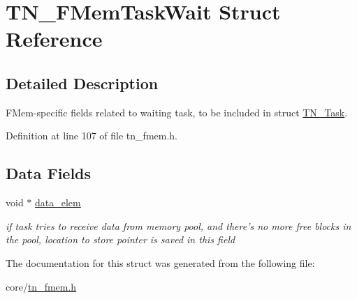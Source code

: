 \hypertarget{structTN__FMemTaskWait}{\section{T\+N\+\_\+\+F\+Mem\+Task\+Wait Struct Reference}
\label{structTN__FMemTaskWait}
}


\subsection{Detailed Description}
F\+Mem-\/specific fields related to waiting task, to be included in struct \hyperlink{structTN__Task}{T\+N\+\_\+\+Task}. 

Definition at line 107 of file tn\+\_\+fmem.\+h.

\subsection*{Data Fields}
\begin{DoxyCompactItemize}
\item 
\hypertarget{structTN__FMemTaskWait_a68632560b260859d863fbd3fc24b0506}{void $\ast$ \hyperlink{structTN__FMemTaskWait_a68632560b260859d863fbd3fc24b0506}{data\+\_\+elem}}\label{structTN__FMemTaskWait_a68632560b260859d863fbd3fc24b0506}

\begin{DoxyCompactList}\small\item\em if task tries to receive data from memory pool, and there's no more free blocks in the pool, location to store pointer is saved in this field \end{DoxyCompactList}\end{DoxyCompactItemize}


The documentation for this struct was generated from the following file\+:\begin{DoxyCompactItemize}
\item 
core/\hyperlink{tn__fmem_8h}{tn\+\_\+fmem.\+h}\end{DoxyCompactItemize}
